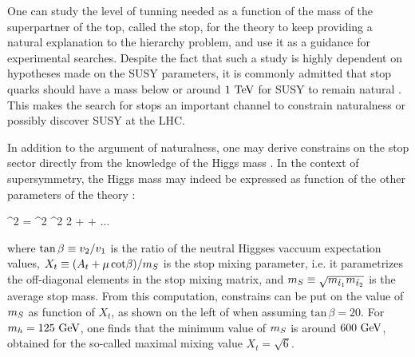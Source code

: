             One can study the level of tunning needed as a function of the mass of the superpartner
            of the top, called the stop, for the theory to keep providing a natural explanation to the hierarchy
            problem, and use it as a guidance for experimental searches. Despite the fact
            that such a study is highly dependent on hypotheses made on the SUSY parameters,
            it is commonly admitted that stop quarks should have a mass below or around $1~\text{TeV}$
            for SUSY to remain natural \cite{TheMoreMinimalSSM, NaturalSusyEndures}. This makes the search for
            stops an important channel to constrain naturalness or possibly discover SUSY
            at the LHC.

            In addition to the argument of naturalness, one may derive constrains on the stop
            sector directly from the knowledge of the Higgs mass \cite{TheLightStopWindow}. In
            the context of supersymmetry, the Higgs mass may indeed be expressed as function
            of the other parameters of the theory :

            {
                ^2
                =
                ^2 ^2 2\beta
                +
                + ...
            }

            where $\text{tan}\, \beta \equiv v_2/v_1$ is the ratio of the neutral
            Higgses vaccuum expectation values,
            $X_t \equiv (A_t + \mu\, \text{cot} \beta) / m_{S}$ is the stop mixing
            parameter, i.e. it parametrizes the off-diagonal elements in the stop mixing
            matrix, and $m_{S} \equiv \sqrt{m_{\tilde{t}_1}m_{\tilde{t}_2}}$ is the average stop
            mass. From this computation, constrains can be put on the value of $m_{S}$ as
            function of $X_t$, as shown on the left of  when assuming $\text{tan}\, \beta
            = 20$. For $m_{h}= 125~\text{GeV}$, one finds that the minimum value of $m_{S}$ is
            around $600~\text{GeV}$, obtained for the so-called maximal mixing value $X_t = \sqrt{6}$.

